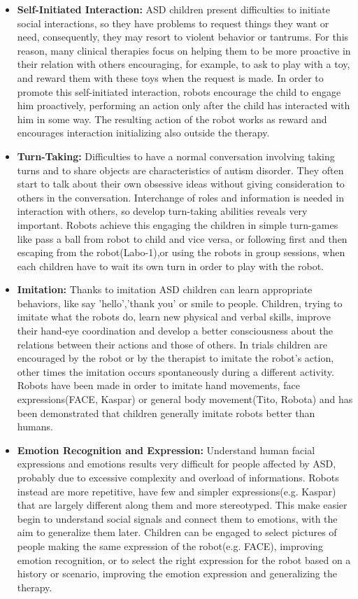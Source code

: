 \begin{itemize}
	\item \textbf{Self-Initiated Interaction:} ASD children present difficulties to initiate social interactions, so they have problems to request things they want or need\cite{ricks2010trends}, consequently, they may resort to violent behavior or tantrums. For this reason, many clinical therapies focus on helping them to be more proactive in their relation with others encouraging, for example, to ask to play with a toy, and reward them with these toys when the request is made. In order to promote this self-initiated interaction, robots encourage the child to engage him proactively, performing an action only after the child has interacted with him in some way. The resulting action of the robot works as reward and encourages interaction initializing also outside the therapy.
	
	\item \textbf{Turn-Taking:} Difficulties to have a normal conversation involving taking turns and to share objects are characteristics of autism disorder. They often start to talk about their own obsessive ideas without giving consideration to others in the conversation. Interchange of roles and information is needed in interaction with others, so develop turn-taking abilities reveals very important. Robots achieve this engaging the children in simple turn-games like pass a ball from robot to child and vice versa, or following first and then escaping from the robot(Labo-1),or using the robots in group sessions, when each children have to wait its own turn in order to play with the robot.
	
	\item \textbf{Imitation:} Thanks to imitation ASD children can learn appropriate behaviors, like say 'hello','thank you' or smile to people. Children, trying to imitate what the robots do, learn new physical and verbal skills, improve their hand-eye coordination and develop a better consciousness about the relations between their actions and those of others. In trials children are encouraged by the robot or by the therapist to imitate the robot's action, other times the imitation occurs spontaneously during a different activity. Robots have been made in order to imitate hand movements, face expressions(FACE, Kaspar) or general body movement(Tito, Robota) and has been demonstrated that children generally imitate robots better than humans. 
	
	\item \textbf{Emotion Recognition and Expression:} Understand human facial expressions and emotions results very difficult for people affected by ASD, probably due to excessive complexity and overload of informations. Robots instead are more repetitive, have few and simpler expressions(e.g. Kaspar) that are largely different along them and more stereotyped. This make easier begin to understand social signals and connect them to emotions, with the aim to generalize them later. Children can be engaged to select pictures of people making the same expression of the robot(e.g. FACE), improving emotion recognition, or to select the right expression for the robot based on a history or scenario, improving the emotion expression and generalizing the therapy.
	

\end{itemize}

